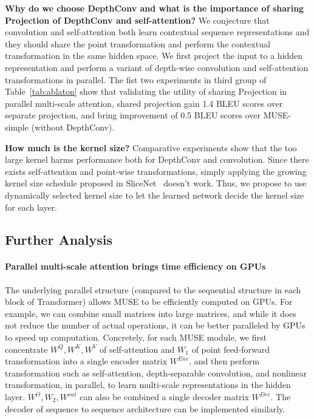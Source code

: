 \documentclass{article} \usepackage{iclr2020_conference,times}
\begin{document}
\textbf{Why do we choose DepthConv and what is the importance of sharing Projection of DepthConv and self-attention?}
We conjecture that convolution and self-attention both learn contextual sequence representations and they should share the point  transformation and perform the contextual transformation in the same hidden space. 
We first project  the input to a hidden representation  and perform a variant of  depth-wise convolution and self-attention transformations in parallel.  
The fist two experiments in third group of Table~\ref{tab:ablaton} show that  validating the utility of sharing Projection in parallel multi-scale attention, shared projection gain 1.4 BLEU scores over separate projection, and bring improvement of 0.5 BLEU scores over MUSE-simple (without DepthConv).

\textbf{How much is the kernel size?}
Comparative experiments show that the too large kernel harms performance  both for DepthConv and convolution. Since there exists self-attention and point-wise transformations, simply applying the growing kernel size schedule proposed in SliceNet~\citep{kaiser2017depthwise}  doesn't  work. Thus, we propose to use dynamically selected kernel size to let the learned network decide the kernel size for each layer.
































\subsection{Further Analysis}

\paragraph{Parallel multi-scale attention brings time efficiency on GPUs}

The underlying parallel structure (compared to the sequential structure in each block of Transformer) allows MUSE to be efficiently computed on GPUs. For example, we can combine small matrices into large matrices, and while it does not reduce the number of actual operations, it can be better paralleled by GPUs to speed up computation.  Concretely, for each MUSE module,  we  first concentrate $W^Q,W^K,W^V$ of self-attention and $W_1$ of point feed-forward transformation into a single encoder matrix $W^{Enc}$, and then perform transformation such as self-attention, depth-separable convolution, and nonlinear transformation, in parallel, to learn multi-scale representations in the hidden layer. $W^O,W_2,W^{out}$ can also be combined a single decoder matrix  $W^{Dec}$. The decoder of sequence to sequence architecture can be implemented similarly.
\end{document}
